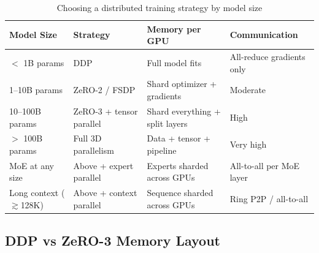 \begin{table}[H]
\centering
\caption{Choosing a distributed training strategy by model size}
\begin{tabularx}{\textwidth}{lXXX}
\toprule
\textbf{Model Size} & \textbf{Strategy} & \textbf{Memory per GPU} & \textbf{Communication} \\
\midrule
$<$ 1B params & DDP & Full model fits & All-reduce gradients only \\
1--10B params & ZeRO-2 / FSDP & Shard optimizer + gradients & Moderate \\
10--100B params & ZeRO-3 + tensor parallel & Shard everything + split layers & High \\
$>$ 100B params & Full 3D parallelism & Data + tensor + pipeline & Very high \\
MoE at any size & Above + expert parallel & Experts sharded across GPUs & All-to-all per MoE layer \\
Long context ($\gtrsim$128K) & Above + context parallel & Sequence sharded across GPUs & Ring P2P / all-to-all \\
\bottomrule
\end{tabularx}
\end{table}

\subsection{DDP vs ZeRO-3 Memory Layout}

